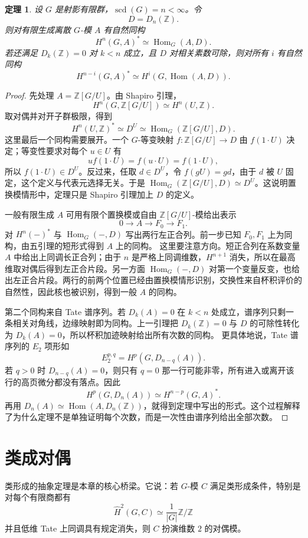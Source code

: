 \documentclass[11pt,a4paper,openany]{ctexbook}
\numberwithin{equation}{chapter}
\newcommand{\Z}{\mathbb{Z}}
\newcommand{\Hom}{\operatorname{Hom}}
\theoremstyle{plain}
\newtheorem{theorem}{定理}[chapter]
\theoremstyle{definition}
\theoremstyle{remark}
\begin{document}
\begin{theorem}
设 $G$ 是射影有限群，$\operatorname{scd}(G)=n<\infty$。令
\[
D=D_n(\Z).
\]
则对有限生成离散 $G$-模 $A$ 有自然同构
\[
H^n(G,A)^*\simeq \Hom_G(A,D).
\]
若还满足 $D_k(\Z)=0$ 对 $k<n$ 成立，且 $D$ 对相关素数可除，则对所有 $i$ 有自然同构
\[
H^{n-i}(G,A)^*\simeq H^i(G,\Hom(A,D)).
\]
\end{theorem}

\begin{proof}
先处理 $A=\Z[G/U]$。由 Shapiro 引理，
\[
H^n(G,\Z[G/U])\simeq H^n(U,\Z).
\]
取对偶并对开子群极限，得到
\[
H^n(U,\Z)^*\simeq D^U\simeq \Hom_G(\Z[G/U],D).
\]
这里最后一个同构需要展开。一个 $G$-等变映射 $f:\Z[G/U]\to D$ 由 $f(1\cdot U)$ 决定；等变性要求对每个 $u\in U$ 有
\[
u f(1\cdot U)=f(u\cdot U)=f(1\cdot U),
\]
所以 $f(1\cdot U)\in D^U$。反过来，任取 $d\in D^U$，令 $f(gU)=gd$，由于 $d$ 被 $U$ 固定，这个定义与代表元选择无关。于是 $\Hom_G(\Z[G/U],D)\simeq D^U$。这说明置换模情形中，定理只是 Shapiro 引理加上 $D$ 的定义。

一般有限生成 $A$ 可用有限个置换模或自由 $\Z[G/U]$-模给出表示
\[
0\to A\to F_0\to F_1.
\]
对 $H^n(-)^*$ 与 $\Hom_G(-,D)$ 写出两行左正合列。前一步已知 $F_0,F_1$ 上为同构，由五引理的短形式得到 $A$ 上的同构。
这里要注意方向。短正合列在系数变量 $A$ 中给出上同调长正合列；由于 $n$ 是严格上同调维数，$H^{n+1}$ 消失，所以在最高维取对偶后得到左正合片段。另一方面 $\Hom_G(-,D)$ 对第一个变量反变，也给出左正合片段。两行的前两个位置已经由置换模情形识别，交换性来自杯积评价的自然性，因此核也被识别，得到一般 $A$ 的同构。

第二个同构来自 Tate 谱序列。若 $D_k(A)=0$ 在 $k<n$ 处成立，谱序列只剩一条相关对角线，边缘映射即为同构。上一引理把 $D_k(\Z)=0$ 与 $D$ 的可除性转化为 $D_k(A)=0$，所以杯积加迹映射给出所有次数的同构。
更具体地说，Tate 谱序列的 $E_2$ 项形如
\[
E_2^{p,q}=H^p(G,D_{n-q}(A)).
\]
若 $q>0$ 时 $D_{n-q}(A)=0$，则只有 $q=0$ 那一行可能非零，所有进入或离开该行的高页微分都没有落点。因此
\[
H^p(G,D_n(A))\simeq H^{n-p}(G,A)^*.
\]
再用 $D_n(A)\simeq\Hom(A,D_n(\Z))$，就得到定理中写出的形式。这个过程解释了为什么定理不是单独证明每个次数，而是一次性由谱序列给出全部次数。
\end{proof}

\section{类成对偶}

类形成的抽象定理是本章的核心桥梁。它说：若 $G$-模 $C$ 满足类形成条件，特别是对每个有限商都有
\[
\widehat H^2(G,C)\simeq \frac1{|G|}\Z/\Z
\]
并且低维 Tate 上同调具有规定消失，则 $C$ 扮演维数 $2$ 的对偶模。
\end{document}
